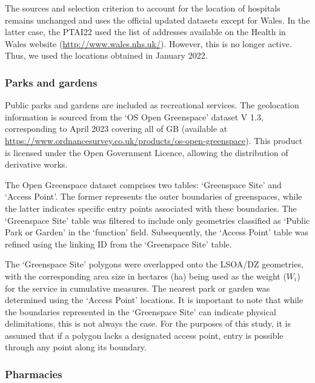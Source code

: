 \documentclass{article}
\begin{document}
The sources and selection criterion to account for the location of
hospitals remains unchanged and uses the official updated datasets
except for Wales. In the latter case, the PTAI22 used the list of
addresses available on the Health in Wales website
(\url{http://www.wales.nhs.uk/}). However, this is no longer active.
Thus, we used the locations obtained in January 2022.

\hypertarget{parks-and-gardens}{%
\subsubsection{Parks and gardens}\label{parks-and-gardens}}

Public parks and gardens are included as recreational services. The
geolocation information is sourced from the `OS Open Greenspace' dataset
V 1.3, corresponding to April 2023 covering all of GB (available at
\url{https://www.ordnancesurvey.co.uk/products/os-open-greenspace}).
This product is licensed under the Open Government Licence, allowing the
distribution of derivative works.

The Open Greenspace dataset comprises two tables: `Greenspace Site' and
`Access Point'. The former represents the outer boundaries of
greenspaces, while the latter indicates specific entry points associated
with these boundaries. The `Greenspace Site' table was filtered to
include only geometries classified as `Public Park or Garden' in the
`function' field. Subsequently, the `Access Point' table was refined
using the linking ID from the `Greenspace Site' table.

The `Greenspace Site' polygons were overlapped onto the LSOA/DZ
geometries, with the corresponding area size in hectares (ha) being used
as the weight (\(W_{i}\)) for the service in cumulative measures. The
nearest park or garden was determined using the `Access Point'
locations. It is important to note that while the boundaries represented
in the `Greenspace Site' can indicate physical delimitations, this is
not always the case. For the purposes of this study, it is assumed that
if a polygon lacks a designated access point, entry is possible through
any point along its boundary.

\hypertarget{pharmacies}{%
\subsubsection{Pharmacies}\label{pharmacies}}
\end{document}
